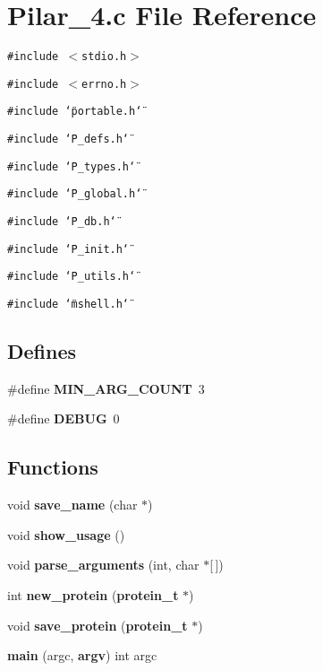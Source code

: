 \section{Pilar\_\-4.c File Reference}
\label{Pilar__4_8c}
{\tt \#include $<$stdio.h$>$}\par
{\tt \#include $<$errno.h$>$}\par
{\tt \#include \char`\"{}portable.h\char`\"{}}\par
{\tt \#include \char`\"{}P\_\-defs.h\char`\"{}}\par
{\tt \#include \char`\"{}P\_\-types.h\char`\"{}}\par
{\tt \#include \char`\"{}P\_\-global.h\char`\"{}}\par
{\tt \#include \char`\"{}P\_\-db.h\char`\"{}}\par
{\tt \#include \char`\"{}P\_\-init.h\char`\"{}}\par
{\tt \#include \char`\"{}P\_\-utils.h\char`\"{}}\par
{\tt \#include \char`\"{}mshell.h\char`\"{}}\par
\subsection*{Defines}
\begin{CompactItemize}
\item 
\#define {\bf MIN\_\-ARG\_\-COUNT}\ 3
\item 
\#define {\bf DEBUG}\ 0
\end{CompactItemize}
\subsection*{Functions}
\begin{CompactItemize}
\item 
void {\bf save\_\-name} (char $\ast$)
\item 
void {\bf show\_\-usage} ()
\item 
void {\bf parse\_\-arguments} (int, char $\ast$[$\,$])
\item 
int {\bf new\_\-protein} ({\bf protein\_\-t} $\ast$)
\item 
void {\bf save\_\-protein} ({\bf protein\_\-t} $\ast$)
\item 
{\bf main} (argc, {\bf argv}) int argc
\end{CompactItemize}
